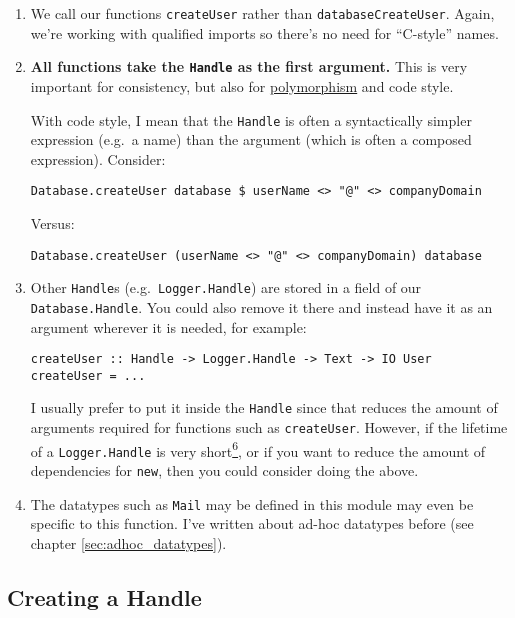 \begin{enumerate}
\item
  We call our functions \texttt{createUser} rather than
  \texttt{databaseCreateUser}. Again, we're working with qualified
  imports so there's no need for ``C-style'' names.
\item
  \textbf{All functions take the \texttt{Handle} as the first argument.}
  This is very important for consistency, but also for
  \href{https://jaspervdj.be/posts/2018-03-08-handle-pattern.html\#handle-polymorphism}{polymorphism}
  and code style.

  With code style, I mean that the \texttt{Handle} is often a
  syntactically simpler expression (e.g.~a name) than the argument
  (which is often a composed expression). Consider:

\begin{verbatim}
Database.createUser database $ userName <> "@" <> companyDomain
\end{verbatim}
  Versus:

\begin{verbatim}
Database.createUser (userName <> "@" <> companyDomain) database
\end{verbatim}
\item
  Other \texttt{Handle}s (e.g.~\texttt{Logger.Handle}) are stored in a
  field of our \texttt{Database.Handle}. You could also remove it there
  and instead have it as an argument wherever it is needed, for example:

\begin{verbatim}
createUser :: Handle -> Logger.Handle -> Text -> IO User
createUser = ...
\end{verbatim}
  I usually prefer to put it inside the \texttt{Handle} since that
  reduces the amount of arguments required for functions such as
  \texttt{createUser}. However, if the lifetime of a
  \texttt{Logger.Handle} is very
  short\href{https://jaspervdj.be/posts/2018-03-08-handle-pattern.html\#fn6}{\textsuperscript{6}},
  or if you want to reduce the amount of dependencies for \texttt{new},
  then you could consider doing the above.
\item
  The datatypes such as \texttt{Mail} may be defined in this module may
  even be specific to this function. I've written about
  ad-hoc datatypes before (see chapter \ref{sec:adhoc_datatypes}).
\end{enumerate}

\subsection{Creating a Handle}

